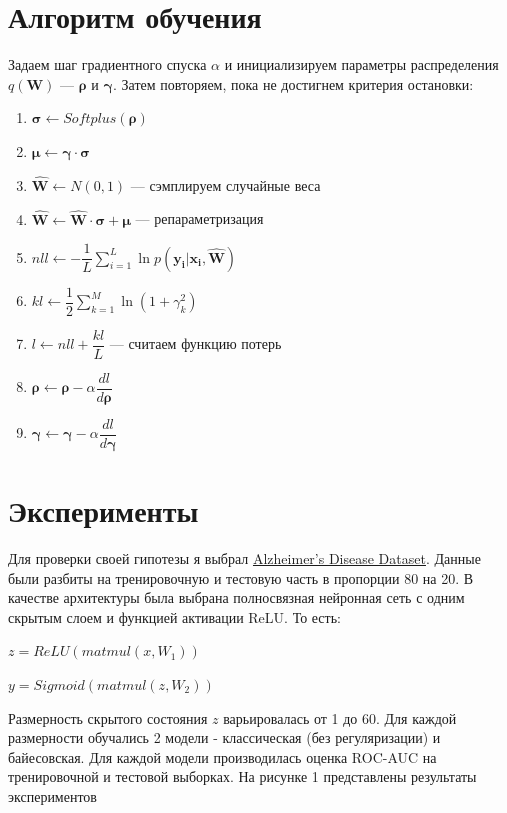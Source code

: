 \documentclass{article}
\begin{document}
\section{Алгоритм обучения}
Задаем шаг градиентного спуска $\alpha$ и инициализируем параметры распределения $q(\mathbf{W})$ — $\pmb{\rho}$ и $\pmb{\gamma}$. Затем повторяем, пока не достигнем критерия остановки:
\begin{enumerate}
    \item $\pmb{\sigma} \leftarrow Softplus(\pmb{\rho})$
    \item $\pmb{\mu} \leftarrow \pmb{\gamma} \cdot \pmb{\sigma}$
    \item $\hat{\mathbf{W}} \leftarrow N(0, 1)$ — сэмплируем случайные веса
    \item $\hat{\mathbf{W}} \leftarrow \hat{\mathbf{W}} \cdot \pmb{\sigma} + \pmb{\mu}$ — репараметризация
    \item $nll \leftarrow -\dfrac{1}{L}\sum_{i=1}^{L}{\ln{p( \mathbf{y_{i}} | \mathbf{x_{i}}, \mathbf{\hat{W}})}}$
    \item $kl \leftarrow \dfrac{1}{2}\sum_{k=1}^{M}\ln({1 + \gamma_{k}^{2}})$
    \item $l \leftarrow nll + \dfrac{kl}{L}$ — считаем функцию потерь
    \item $\pmb{\rho} \leftarrow \pmb{\rho} - \alpha \dfrac{d l}{d \pmb{\rho}}$
    \item $\pmb{\gamma} \leftarrow \pmb{\gamma} - \alpha \dfrac{d l}{d \pmb{\gamma}}$
\end{enumerate}

\section{Эксперименты}

Для проверки своей гипотезы я выбрал \href{https://www.kaggle.com/datasets/rabieelkharoua/alzheimers-disease-dataset}{Alzheimer's Disease Dataset}. Данные были разбиты на тренировочную и тестовую часть в пропорции 80 на 20. В качестве архитектуры была выбрана полносвязная нейронная сеть с одним скрытым слоем и функцией активации ReLU. То есть:

$z = ReLU(matmul(x, W_1))$

$y = Sigmoid(matmul(z, W_2))$

Размерность скрытого состояния $z$ варьировалась от 1 до 60. Для каждой размерности обучались 2 модели - классическая (без регуляризации) и байесовская. Для каждой модели производилась оценка ROC-AUC на тренировочной и тестовой выборках. На рисунке 1 представлены результаты экспериментов
\end{document}
